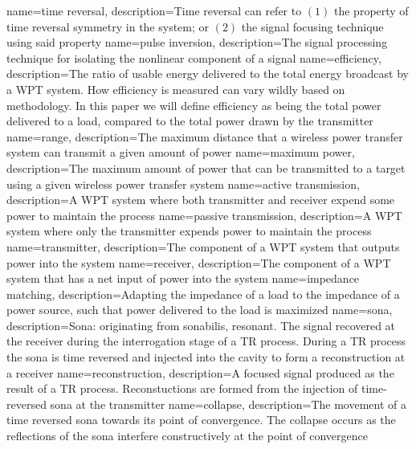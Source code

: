 
{
    name=time reversal,
    description={Time reversal can refer to $(1)$ the property of time reversal symmetry in the system; or $(2)$ the signal focusing technique using said property}
}
{
   name=pulse inversion,
  description={The signal processing technique for isolating the nonlinear component of a signal}
}
{
   name=efficiency,
  description={The ratio of usable energy delivered to the total energy broadcast by a WPT system. How efficiency is measured can vary wildly based on methodology. In this paper we will define efficiency as being the total power delivered to a load, compared to the total power drawn by the transmitter}
}
{
   name=range,
  description={The maximum distance that a wireless power transfer system can transmit a given amount of power}
}
{
   name=maximum power,
  description={The maximum amount of power that can be transmitted to a target using a given wireless power transfer system}
}
{
   name=active transmission,
  description={A WPT system where both transmitter and receiver expend some power to maintain the process}
}
{
   name=passive transmission,
  description={A WPT system where only the transmitter expends power to maintain the process}
}
{
   name=transmitter,
  description={The component of a WPT system that outputs power into the system}
}
{
   name=receiver,
  description={The component of a WPT system that has a net input of power into the system}
}
{
   name=impedance matching,
  description={Adapting the impedance of a load to the impedance of a power source, such that power delivered to the load is maximized}
}
{
   name=sona,
  description={Sona: originating from sonabilis, resonant. The signal recovered at the receiver during the interrogation stage of a TR process. During a TR process the sona is time reversed and injected into the cavity to form a reconstruction at a receiver}
}
{
   name=reconstruction,
  description={A focused signal produced as the result of a TR process. Reconstuctions are formed from the injection of time-reversed sona at the transmitter}
}
{
   name=collapse,
  description={The movement of a time reversed sona towards its point of convergence.  The collapse occurs as the reflections of the sona interfere constructively at the point of convergence}
}
